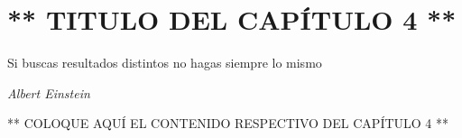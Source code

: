 \chapter{** TITULO DEL CAPÍTULO 4 **}
\thispagestyle{empty}

\epigraph{\flushright Si buscas resultados distintos no hagas siempre lo mismo}{\textit{Albert Einstein}}

** COLOQUE AQUÍ EL CONTENIDO RESPECTIVO DEL CAPÍTULO 4 **
